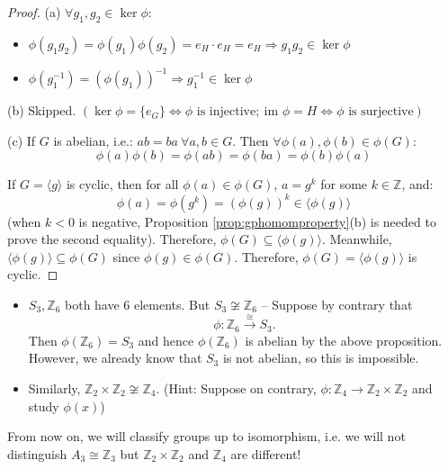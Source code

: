 \begin{proof}
(a) $\forall g_1, g_2 \in \ker \phi$:
\begin{itemize}
    \item[(i)] $\phi(g_1 g_2) = \phi(g_1) \phi(g_2) = e_H \cdot e_H = e_H \Rightarrow g_1 g_2 \in \ker \phi$
    \item[(ii)] $\phi(g_1^{-1}) = (\phi(g_1))^{-1} \Rightarrow g_1^{-1} \in \ker \phi$
\end{itemize}

(b) Skipped. $\left( \ker \phi = \{e_G\} \iff \phi \text{ is injective}; \ \text{im } \phi = H \iff \phi \text{ is surjective} \right)$

(c) If $G$ is abelian, i.e.: $ab = ba \ \forall a, b \in G$. Then $\forall \phi(a), \phi(b) \in \phi(G)$:
    \[ \phi(a) \phi(b) = \phi(ab) = \phi(ba) = \phi(b) \phi(a) \]
    
    
If $G = \langle g \rangle$ is cyclic, then for all $\phi(a) \in \phi(G)$, $a = g^k$ for some $k \in \mathbb{Z}$, and:
    \[ \phi(a) = \phi(g^k) = (\phi(g))^k \in \langle \phi(g) \rangle \]
    (when $k < 0$ is negative,  Proposition \ref{prop:gphomomproperty}(b) is needed to prove the second equality). Therefore, $\phi(G) \subseteq \langle \phi(g) \rangle$. Meanwhile, $\langle \phi(g) \rangle \subseteq \phi(G)$ since $\phi(g) \in \phi(G)$. Therefore, $\phi(G) = \langle \phi(g) \rangle$ is cyclic.
\end{proof}

\begin{example}
\begin{itemize}
    \item $S_3, \mathbb{Z}_6$ both have 6 elements. But $S_3 \not\cong \mathbb{Z}_6$ -- Suppose by contrary that 
    $$\phi : \mathbb{Z}_6 \xrightarrow{\cong} S_3.$$ Then $\phi(\mathbb{Z}_6) = S_3$ and hence $\phi(\mathbb{Z}_6)$ is abelian by the above proposition. However, we already know that $S_3$ is not abelian, so this is impossible.
    
    \item Similarly, $\mathbb{Z}_2 \times \mathbb{Z}_2 \not\cong \mathbb{Z}_4$. (Hint: Suppose on contrary, $\phi : \mathbb{Z}_4 \to \mathbb{Z}_2 \times \mathbb{Z}_2$ and study $\phi(x)$)
\end{itemize}
\end{example}

From now on, we will classify groups up to isomorphism, i.e. we will not distinguish $A_3 \cong \mathbb{Z}_3$ but $\mathbb{Z}_2 \times \mathbb{Z}_2$ and $\mathbb{Z}_4$ are different!


